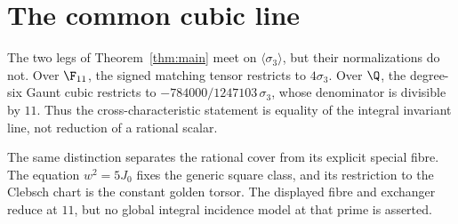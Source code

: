 \section{The common cubic line}
\label{sec:consequences}

The two legs of Theorem~\ref{thm:main} meet on
\(\langle\sigma_3\rangle\), but their normalizations do not.  Over
\(\F_{11}\), the signed matching tensor restricts to \(4\sigma_3\).  Over
\(\Q\), the degree-six Gaunt cubic restricts to
\(-784000/1247103\,\sigma_3\), whose denominator is divisible by \(11\).
Thus the cross-characteristic statement is equality of the integral
invariant line, not reduction of a rational scalar.

The same distinction separates the rational cover from its explicit
special fibre.  The equation \(w^2=5J_0\) fixes the generic square class,
and its restriction to the Clebsch chart is the constant golden torsor.
The displayed fibre and exchanger reduce at \(11\), but no global integral
incidence model at that prime is asserted.
